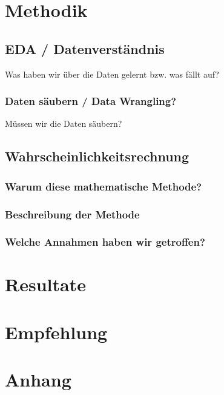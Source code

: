 \documentclass[a4paper,10pt]{report}
\begin{document}
    \chapter{Methodik}


    \section{EDA / Datenverständnis}
    Was haben wir über die Daten gelernt bzw. was fällt auf?

    \subsection{Daten säubern / Data Wrangling?}
    Müssen wir die Daten säubern?


    \section{Wahrscheinlichkeitsrechnung}

    \subsection{Warum diese mathematische Methode?}

    \subsection{Beschreibung der Methode}

    \subsection{Welche Annahmen haben wir getroffen?}


    \chapter{Resultate}


    \chapter{Empfehlung}


    \chapter{Anhang}
\end{document}
